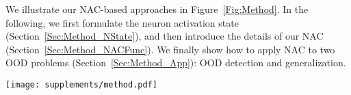 \documentclass{article} \usepackage{iclr2024_conference,times}
\begin{document}
We illustrate our {NAC}-based approaches in Figure~\ref{Fig:Method}. In the following, we first formulate the neuron activation state (Section~\ref{Sec:Method_NState}), and then introduce the details of our NAC (Section~\ref{Sec:Method_NACFunc}). We finally show how to apply NAC to two OOD problems (Section~\ref{Sec:Method_App}): OOD detection and generalization.


\begin{figure*}
	[t]
	\centering \texttt{[image: supplements/method.pdf]} \vspace{-2mm}
\caption{Illustration of our NAC-based methods. NAC is derived from the probability density function (PDF), which quantifies the coverage degree of neuron states under the InD training set $X$.
Building upon NAC, we devise two approaches for tackling different OOD problems: OOD Detection (\texttt{NAC-UE}) and OOD Generalization (\texttt{NAC-ME}).
}
	\label{Fig:Method}
	\vspace{-2mm}
\end{figure*}



\vspace{-1mm}
\end{document}
